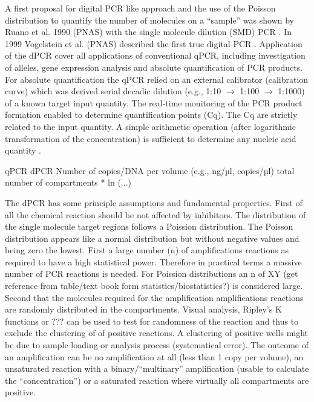 \documentclass{bioinfo}
\begin{document}
A first proposal for digital PCR like approach and the use of the Poisson 
distribution to quantify the number of molecules on a ``sample'' was shown by 
Ruano et al. 1990 (PNAS) with the single molecule dilution (SMD) PCR \cite{ruano_haplotype_1990}. In 1999 
Vogelstein et al. (PNAS) described the first true digital PCR \cite{vogelstein_digital_1999}. Application of 
the dPCR cover all applications of conventional qPCR, including investigation of 
alleles, gene expression analysis and absolute quantification of PCR products. 
For absolute quantification the qPCR relied on an external calibrator 
(calibration curve) which was derived serial decadic dilution (e.g., 1:10 $\rightarrow$ 
1:100 $\rightarrow$ 1:1000) of a known target input quantity. The real-time monitoring of 
the PCR product formation enabled to determine quantification points (Cq). The 
Cq are strictly related to the input quantity. A simple arithmetic operation 
(after logarithmic transformation of the concentration) is sufficient to 
determine any nucleic acid quantity \cite{huggett_considerations_2014}.

qPCR	dPCR
Number of copies/DNA per volume (e.g., ng/µl, copies/µl)	total number of compartments * ln (...)

The dPCR has some principle assumptions and fundamental properties. First of all 
the chemical reaction should be not affected by inhibitors. The distribution of 
the single molecule target regions follows a Poission distribution. The Poisson 
distribution appears like a normal distribution but without negative values and 
being zero the lowest. First a large number (n) of amplifications reactions as 
required to have a high statistical power. Therefore in practical terms a 
massive number of PCR reactions is needed. For Poission distributions an n of XY 
(get reference from table/text book form statistics/biostatistics?) is 
considered large. Second that the molecules required for the amplification 
amplifications reactions are randomly distributed in the compartments. Visual 
analysis, Ripley's K functions or ??? can be used to test for randomness of the 
reaction and thus to exclude the clustering of of positive reactions. A 
clustering of positive wells might be due to sample loading or analysis process 
(systematical error). The outcome of an amplification can be no amplification at 
all (less than 1 copy per volume), an unsaturated reaction with a 
binary/``multinary'' amplification (usable to calculate the ``concentration'') 
or a saturated reaction where virtually all compartments are positive.
\end{document}
